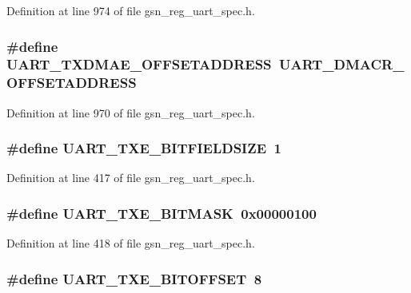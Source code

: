 Definition at line 974 of file gsn\_\-reg\_\-uart\_\-spec.h.

\hypertarget{a00575_ab2dba76575a549b2319cf9f03bfb827a}{
\subsubsection[{UART\_\-TXDMAE\_\-OFFSETADDRESS}]{\setlength{\rightskip}{0pt plus 5cm}\#define UART\_\-TXDMAE\_\-OFFSETADDRESS~UART\_\-DMACR\_\-OFFSETADDRESS}}
\label{a00575_ab2dba76575a549b2319cf9f03bfb827a}


Definition at line 970 of file gsn\_\-reg\_\-uart\_\-spec.h.

\hypertarget{a00575_a39d36540ed2feb69dc4e46cc5fe62117}{
\subsubsection[{UART\_\-TXE\_\-BITFIELDSIZE}]{\setlength{\rightskip}{0pt plus 5cm}\#define UART\_\-TXE\_\-BITFIELDSIZE~1}}
\label{a00575_a39d36540ed2feb69dc4e46cc5fe62117}


Definition at line 417 of file gsn\_\-reg\_\-uart\_\-spec.h.

\hypertarget{a00575_a039a93f5e3da93c07a63918f4635f7a7}{
\subsubsection[{UART\_\-TXE\_\-BITMASK}]{\setlength{\rightskip}{0pt plus 5cm}\#define UART\_\-TXE\_\-BITMASK~0x00000100}}
\label{a00575_a039a93f5e3da93c07a63918f4635f7a7}


Definition at line 418 of file gsn\_\-reg\_\-uart\_\-spec.h.

\hypertarget{a00575_a237ba9314dfa95cd248222e883a8a968}{
\subsubsection[{UART\_\-TXE\_\-BITOFFSET}]{\setlength{\rightskip}{0pt plus 5cm}\#define UART\_\-TXE\_\-BITOFFSET~8}}
\label{a00575_a237ba9314dfa95cd248222e883a8a968}



